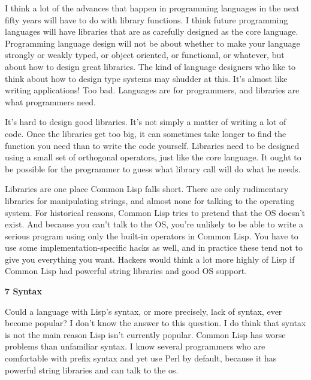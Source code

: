 I think a lot of the advances that happen
                  in programming languages in the next fifty years will have to
                  do with library functions. I think future programming
                  languages will have libraries that are as carefully designed
                  as the core language. Programming language design will not be
                  about whether to make your language strongly or weakly typed,
                  or object oriented, or functional, or whatever, but about how
                  to design great libraries. The kind of language designers who
                  like to think about how to design type systems may shudder at
                  this. It's almost like writing applications! Too bad.
                  Languages are for programmers, and libraries are what
                  programmers need.

It's hard to design good
                  libraries. It's not simply a matter of writing a lot of code.
                  Once the libraries get too big, it can sometimes take longer
                  to find the function you need than to write the code yourself.
                  Libraries need to be designed using a small set of orthogonal
                  operators, just like the core language. It ought to be
                  possible for the programmer to guess what library call will do
                  what he needs.

Libraries are one place Common Lisp
                  falls short. There are only rudimentary libraries for
                  manipulating strings, and almost none for talking to the
                  operating system. For historical reasons, Common Lisp tries to
                  pretend that the OS doesn't exist. And because you can't talk
                  to the OS, you're unlikely to be able to write a serious
                  program using only the built-in operators in Common Lisp. You
                  have to use some implementation-specific hacks as well, and in
                  practice these tend not to give you everything you want.
                  Hackers would think a lot more highly of Lisp if Common Lisp
                  had powerful string libraries and good OS support.

\textbf{7 Syntax}

Could a language with Lisp's syntax, or more
                  precisely, lack of syntax, ever become popular? I don't know
                  the answer to this question. I do think that syntax is not the
                  main reason Lisp isn't currently popular. Common Lisp has
                  worse problems than unfamiliar syntax. I know several
                  programmers who are comfortable with prefix syntax and yet use
                  Perl by default, because it has powerful string libraries and
                  can talk to the os.

